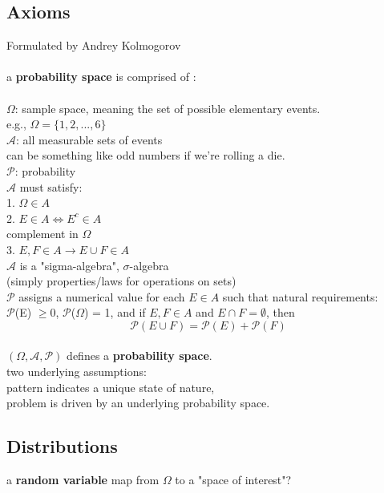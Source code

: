\documentclass[12pt]{article}
\begin{document}
\subsection*{Axioms}
 Formulated by Andrey Kolmogorov\\
 \ \\
a \textbf{probability space} is comprised of :\\
\ \\
$\Omega$: sample space, meaning the set of possible elementary events.\\
\indent e.g., $\Omega = \{1, 2, ..., 6\}$\\
$\mathcal{A}$: all measurable sets of events\\
\indent *can be something like odd numbers if we're rolling a die.\\
$\mathcal{P}$: probability\\


$\mathcal{A}$ must satisfy:\\
1. $\Omega \in A$\\
2. $E \in A \iff E^c \in A$ \\
\indent *complement in $\Omega$\\
3. $E, F \in A \rightarrow E \cup F \in A$\\

$\mathcal{A}$ is a "sigma-algebra", $\sigma$-algebra \\
(simply properties/laws for operations on sets)\\

$\mathcal{P}$ assigns a numerical value for each $E \in A$ such that
natural requirements:\\
$\mathcal{P}$(E) $ \geq 0$, $\mathcal{P}$($\Omega$) = 1, and
if $E, F \in A$ and $E \cap F = \emptyset$, then \\
$$\mathcal{P}(E \cup F) = \mathcal{P}(E) + \mathcal{P}(F)$$
\ \\

$(\Omega, \mathcal{A}, \mathcal{P})$ defines a \textbf{probability space}.\\

\noindent two underlying assumptions: \\
pattern indicates a unique state of nature,\\
problem is driven by an underlying probability space.\\

\subsection*{Distributions}
\noindent a \textbf{random variable} map from  $\Omega$ to a "space of interest"?
\end{document}
